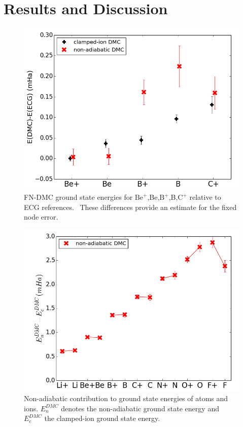 \documentclass[pra,superscriptaddress,groupedaddress,twocolumn]{revtex4}
\begin{document}
\section{Results and Discussion}


\begin{figure}
\centering
\includegraphics[scale=.4]{Figures/atom-ECG}
\caption{FN-DMC ground state energies for $\text{Be}^+$,Be,$\text{B}^+$,B,$\text{C}^+$ relative to ECG references.~\cite{Stanke_Be,Puchalski_Be+,Bubin_BeH_noBO,Bubin_B,Bubin_B+,Bubin_C+} These differences provide an estimate for the fixed node error. \label{fig:atom-ECG}}
\end{figure}

\begin{figure}
\includegraphics[scale=.37]{Figures/atom-nad-ad}
\caption{Non-adiabatic contribution to ground state energies of atoms and ions. $E_n^{DMC}$ denotes the non-adiabatic ground state energy and $E_c^{DMC}$ the clamped-ion ground state energy.}
\end{figure}
\end{document}
